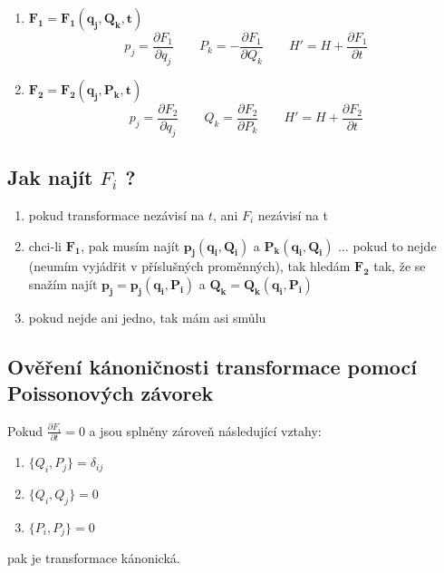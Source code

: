 \documentclass[a5paper,12pt]{article}
\begin{document}
\begin{enumerate}
\item $\boldsymbol{F_1 = F_1(q_j, Q_k, t)}$\\
\begin{equation*}
\boxed{
p_j = \frac{\partial F_1}{\partial q_j} \qquad
P_k = - \frac{\partial F_1}{\partial Q_k} \qquad
H' = H + \frac{\partial F_1}{\partial t}
}
\end{equation*}

\item $\boldsymbol{F_2 = F_2(q_j, P_k, t)}$\\
\begin{equation*}
\boxed{
p_j = \frac{\partial F_2}{\partial q_j} \qquad
Q_k = \frac{\partial F_2}{\partial P_k} \qquad
H' = H + \frac{\partial F_2}{\partial t}
}
\end{equation*}
\end{enumerate}

\subsection{Jak najít $F_i$ ?}

\begin{enumerate}
	\item pokud transformace nezávisí na $t$, ani $F_i$ nezávisí na t
	\item chci-li $\boldsymbol{F_1}$, pak musím najít $\boldsymbol{p_j (q_i, Q_i)}$ a $\boldsymbol{P_k (q_i, Q_i)}$ ... pokud to nejde (neumím vyjádřit v příslušných proměnných), tak hledám $\boldsymbol{F_2}$ tak, že se snažím najít $\boldsymbol{p_j = p_j (q_i, P_i)}$ a $\boldsymbol{Q_k = Q_k (q_i, P_i)}$
	\item pokud nejde ani jedno, tak mám asi smůlu
\end{enumerate}

\subsection{Ověření kánoničnosti transformace pomocí Poissonových závorek}
Pokud $\frac{\partial F_i}{\partial t} = 0$ a jsou splněny zároveň následující vztahy:
\begin{enumerate}
	\item $\{Q_i, P_j\} = \delta_{ij}$
	\item $\{Q_i, Q_j\} = 0$
	\item $\{P_i, P_j\} = 0$
\end{enumerate}

\noindent pak je transformace kánonická.
\end{document}
